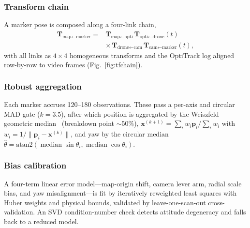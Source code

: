 \documentclass[conference]{IEEEtran}
\newcommand{\Tmat}{\mathbf{T}}
\begin{document}
\subsubsection{Transform chain}
A marker pose is composed along a four-link chain,
\begin{equation}
\begin{split}
\Tmat_{\text{map}\leftarrow\text{marker}}={}&
\Tmat_{\text{map}\leftarrow\text{opti}}\,
\Tmat_{\text{opti}\leftarrow\text{drone}}(t)\\
&\times\,
\Tmat_{\text{drone}\leftarrow\text{cam}}\,
\Tmat_{\text{cam}\leftarrow\text{marker}}(t),
\end{split}
\end{equation}
with all links as $4\times4$ homogeneous transforms and the OptiTrack log aligned
row-by-row to video frames (Fig.~\ref{fig:tfchain}).

\subsubsection{Robust aggregation}
Each marker accrues 120--180 observations. These pass a per-axis and circular
MAD gate ($k=3.5$), after which position is aggregated by the Weiszfeld
geometric median~\cite{weiszfeld} (breakdown point ${\sim}50\%$),
$\mathbf{x}^{(k+1)}=\sum_i w_i\mathbf{p}_i/\sum_i w_i$ with $w_i=1/\lVert
\mathbf{p}_i-\mathbf{x}^{(k)}\rVert$, and yaw by the circular median
$\hat\theta=\mathrm{atan2}(\operatorname{median}\sin\theta_i,
\operatorname{median}\cos\theta_i)$.

\subsubsection{Bias calibration}
A four-term linear error model---map-origin shift, camera lever arm, radial scale
bias, and yaw misalignment---is fit by iteratively reweighted least squares with
Huber weights and physical bounds, validated by leave-one-scan-out
cross-validation. An SVD condition-number check detects attitude degeneracy and
falls back to a reduced model.
\end{document}
